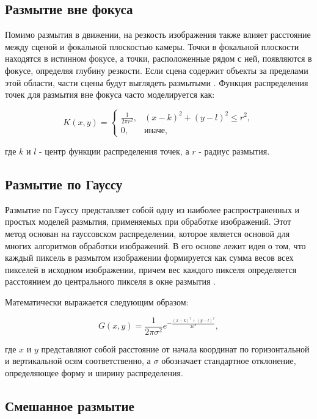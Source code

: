 \subsection{Размытие вне фокуса}

Помимо размытия в движении, на резкость изображения также влияет расстояние между сценой и фокальной плоскостью камеры. Точки в фокальной плоскости находятся в истинном фокусе, а точки, расположенные рядом с ней, появляются в фокусе, определяя глубину резкости. Если сцена содержит объекты за пределами этой области, части сцены будут выглядеть размытыми \cite{zhang2020deblurring}. Функция распределения точек для размытия вне фокуса часто моделируется как:

\begin{equation}\label{eq:deblurring}
	K(x, y) = \begin{cases}
		\frac{1}{2 \pi r^2}, & (x - k)^2 + (y - l)^2 \leq r^2, \\
		0, & \text{иначе},
	\end{cases}
\end{equation}

где \(k\) и \(l\) - центр функции распределения точек, а \(r\) - радиус размытия.

\subsection{Размытие по Гауссу}

Размытие по Гауссу представляет собой одну из наиболее распространенных и простых моделей размытия, применяемых при обработке изображений. Этот метод основан на гауссовском распределении, которое является основой для многих алгоритмов обработки изображений. В его основе лежит идея о том, что каждый пиксель в размытом изображении формируется как сумма весов всех пикселей в исходном изображении, причем вес каждого пикселя определяется расстоянием до центрального пикселя в окне размытия \cite{chen2009empirical}.

Математически выражается следующим образом:

\begin{equation}
	G(x, y) = \frac{1}{2 \pi \sigma^2} e^{-\frac{(x - k)^2 + (y - l)^2}{2 \sigma^2}},
\end{equation}

где \(x\) и \(y\) представляют собой расстояние от начала координат по горизонтальной и вертикальной осям соответственно, а \(\sigma\) обозначает стандартное отклонение, определяющее форму и ширину распределения.
\subsection{Смешанное размытие}

